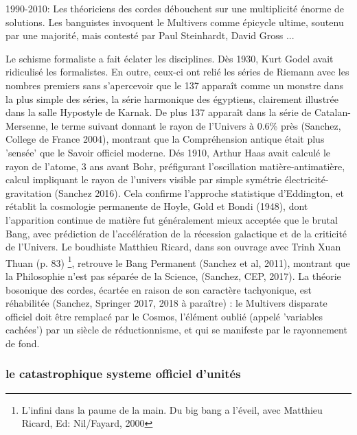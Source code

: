 \documentclass[a4paper,12pt]{article}
\begin{document}
1990-2010:  Les théoriciens des cordes débouchent sur une multiplicité énorme de solutions. Les banguistes invoquent le Multivers comme épicycle ultime, soutenu par une majorité, mais contesté par Paul Steinhardt, David Gross ...

Le schisme formaliste a fait éclater les disciplines. Dès 1930, Kurt Godel avait ridiculisé les formalistes. En outre, ceux-ci ont relié les séries de Riemann avec les nombres premiers sans s'apercevoir que le 137 apparaît comme un monstre dans la plus simple des séries, la série harmonique des égyptiens, clairement illustrée dans la salle Hypostyle de Karnak. De plus 137 apparaît dans la série de Catalan-Mersenne, le terme suivant donnant le rayon de l'Univers à 0.6\% près (Sanchez, College de France 2004), montrant que la Compréhension antique était plus 'sensée' que le Savoir officiel moderne. Dés 1910, Arthur Haas avait calculé le rayon de l'atome, 3 ans avant Bohr, préfigurant l'oscillation matière-antimatière, calcul impliquant le rayon de l'univers visible par simple symétrie électricité-gravitation (Sanchez 2016). Cela confirme l'approche statistique d'Eddington, et rétablit la cosmologie permanente de Hoyle, Gold et Bondi (1948), dont l'apparition continue de matière fut généralement mieux acceptée que le brutal Bang, avec prédiction de l'accélération de la récession galactique et de la criticité de l'Univers. Le boudhiste Matthieu Ricard, dans son ouvrage avec Trinh Xuan Thuan (p. 83) \footnote{L'infini dans la paume de la main. Du big bang a l'éveil, avec Matthieu Ricard, Ed: Nil/Fayard, 2000}, retrouve le Bang Permanent (Sanchez et al, 2011), montrant que la Philosophie n'est pas séparée de la Science, (Sanchez, CEP, 2017). La théorie bosonique des cordes, écartée en raison de son caractère tachyonique, est réhabilitée (Sanchez, Springer 2017, 2018 à paraître) : le Multivers disparate officiel doit être remplacé par le Cosmos, l'élément oublié (appelé 'variables cachées') par un siècle de réductionnisme, et qui se manifeste par le rayonnement de fond.
















\subsubsection {le catastrophique systeme officiel d'unités}
\end{document}
